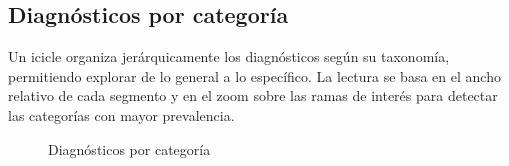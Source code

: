 \subsection{Diagnósticos por categoría}
Un icicle \cite{icicle} organiza jerárquicamente los diagnósticos según su taxonomía, permitiendo explorar de lo general a lo específico. La lectura se basa en el ancho relativo de cada segmento y en el zoom sobre las ramas de interés para detectar las categorías con mayor prevalencia.
\begin{figure}[H]
  \centering
  \caption{Diagnósticos por categoría}
  \label{fig:chart-diag}
\end{figure}

